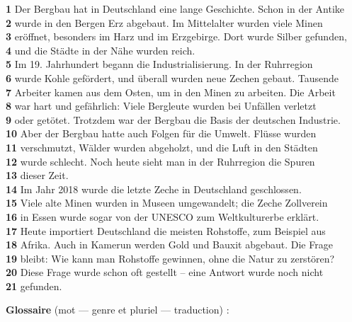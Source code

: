 \documentclass[11pt]{article}
\begin{document}
\begin{textebox}
\textbf{1} Der Bergbau hat in Deutschland eine lange Geschichte. Schon in der Antike\\
\textbf{2} wurde in den Bergen Erz abgebaut. Im Mittelalter wurden viele Minen\\
\textbf{3} eröffnet, besonders im Harz und im Erzgebirge. Dort wurde Silber gefunden,\\
\textbf{4} und die Städte in der Nähe wurden reich.\\
\textbf{5} Im 19. Jahrhundert begann die Industrialisierung. In der Ruhrregion\\
\textbf{6} wurde Kohle gefördert, und überall wurden neue Zechen gebaut. Tausende\\
\textbf{7} Arbeiter kamen aus dem Osten, um in den Minen zu arbeiten. Die Arbeit\\
\textbf{8} war hart und gefährlich: Viele Bergleute wurden bei Unfällen verletzt\\
\textbf{9} oder getötet. Trotzdem war der Bergbau die Basis der deutschen Industrie.\\
\textbf{10} Aber der Bergbau hatte auch Folgen für die Umwelt. Flüsse wurden\\
\textbf{11} verschmutzt, Wälder wurden abgeholzt, und die Luft in den Städten\\
\textbf{12} wurde schlecht. Noch heute sieht man in der Ruhrregion die Spuren\\
\textbf{13} dieser Zeit.\\
\textbf{14} Im Jahr 2018 wurde die letzte Zeche in Deutschland geschlossen.\\
\textbf{15} Viele alte Minen wurden in Museen umgewandelt; die Zeche Zollverein\\
\textbf{16} in Essen wurde sogar von der UNESCO zum Weltkulturerbe erklärt.\\
\textbf{17} Heute importiert Deutschland die meisten Rohstoffe, zum Beispiel aus\\
\textbf{18} Afrika. Auch in Kamerun werden Gold und Bauxit abgebaut. Die Frage\\
\textbf{19} bleibt: Wie kann man Rohstoffe gewinnen, ohne die Natur zu zerstören?\\
\textbf{20} Diese Frage wurde schon oft gestellt – eine Antwort wurde noch nicht\\
\textbf{21} gefunden.
\end{textebox}

\textbf{Glossaire} (mot — genre et pluriel — traduction) :
\end{document}
